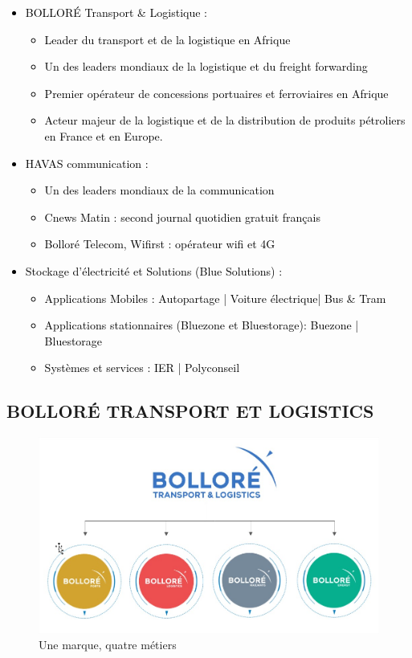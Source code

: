 \documentclass[a4paper,12pt]{report}
\begin{document}
\textcolor{black}{

\begin{itemize}
	\item	BOLLORÉ Transport & Logistique : 
\begin{itemize}
	\item Leader du transport et de la logistique en Afrique 
	\item Un des leaders mondiaux de la logistique et du freight forwarding
	\item Premier opérateur de concessions portuaires et ferroviaires en Afrique
	\item Acteur majeur de la logistique et de la distribution de produits pétroliers en France et en Europe. 
\end{itemize}

\item	HAVAS communication : 
\begin{itemize}
	\item Un des leaders mondiaux de la communication 
	\item Cnews Matin : second journal quotidien gratuit français 
	\item Bolloré Telecom, Wifirst : opérateur wifi et 4G	
\end{itemize}

\item	Stockage d’électricité et Solutions (Blue Solutions) : 
\begin{itemize}
	\item Applications Mobiles : Autopartage | Voiture électrique| Bus & Tram
	\item Applications stationnaires (Bluezone et Bluestorage): Buezone | Bluestorage
	\item Systèmes et services : IER | Polyconseil 
\end{itemize}
\end{itemize}
}

\subsection{BOLLORÉ TRANSPORT ET LOGISTICS}
\vspace{-0.5cm}
\begin{figure}[H]
	\begin{center}
		\includegraphics[width=0.55\linewidth]{images_BOLLORE/BTL}
	\end{center}
		\caption{Une marque, quatre métiers}
	\label{fig:2}	
\end{figure}
\end{document}
